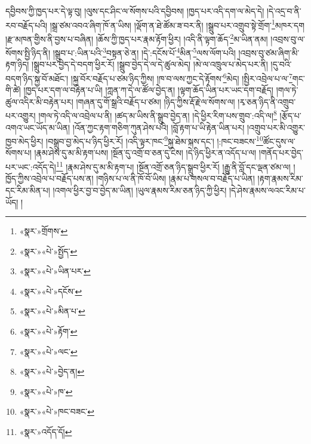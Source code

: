 དབྱིབས་ཀྱི་ཁྱད་པར་དེ་ལྟ་བུ། །ལུས་དང་ཤིང་ལ་སོགས་པའི་དབྱིབས། །ཁྱད་པར་འདི་དག་ལ་མེད་དེ། །དེ་འདྲ་བ་ནི་རབ་བརྗོད་པའི། །སྒྲ་ཙམ་འབའ་ཞིག་ཁོ་ན་ཡིས། །ལྡོག་ན་ཐེ་ཚོམ་ཟ་བར་ནི། །སྒྲུབ་པར་འགྲུབ་སྟེ་གྲོག་\footnote{«སྣར་»གྲོགས་}མཁར་དག །རྫ་མཁན་གྱིས་ནི་བྱས་པ་བཞིན། །ཆོས་ཀྱི་ཁྱད་པར་རྣམ་རྟོག་ཕྱིར། །འདི་ནི་ལྟག་ཆོད་\footnote{«སྣར་»«པེ་»སྤྱོད་}མ་ཡིན་ནམ། །འབྲས་བུ་ལ་སོགས་སྤྱི་ཉིད་ནི། །སྒྲུབ་པ་:ཡིན་པའི་\footnote{«སྣར་»«པེ་»ཡིན་པར་}བསྟན་ཅེ་ན། །དེ་:དངོས་པོ་\footnote{«སྣར་»«པེ་»དངོས་}མིན་\footnote{«སྣར་»«པེ་»མིན་པ་}ལས་ལོག་པའི། །འབྲས་བུ་ཙམ་ཞིག་མི་རྟག་ཉིད། །སྒྲུབ་པར་བྱེད་དེ་བདག་ཕྱིར་རོ། །སྒྲུབ་བྱེད་དེ་ལ་དེ་ཚུལ་མེད། །མེ་ལ་འཁྲུལ་པ་མེད་པར་ནི། །དུ་བའི་བདག་ཉིད་སྐྱ་བོ་མཐོང་། །སྐྱ་བོར་བརྗོད་པ་ཙམ་ཉིད་ཀྱིས། །ཁ་བ་ལས་ཀྱང་དེ་རྟོགས་\footnote{«སྣར་»«པེ་»རྟོག་}མེད། །སྤྱིར་འབྲེལ་པ་ལ་\footnote{«སྣར་»«པེ་»ལང་}གང་གི་ཚེ། །ཁྱད་པར་དག་ལ་བརྟེན་པ་ཡི། །ཀླན་ཀ་དེ་ལ་ཚོལ་བྱེད་ན། །ལྟག་ཆོད་ཡིན་པར་ཡང་དག་བརྗོད། །གལ་ཏེ་ཚུལ་འདིར་མི་བརྟེན་པར། །གཞན་དུ་གོ་སྒྲའི་བརྗོད་པ་ཙམ། །ཉིད་ཀྱིས་རྡོ་རྗེ་ལ་སོགས་ལ། །རྭ་ཅན་ཉིད་ནི་འགྲུབ་པར་འགྱུར། །གལ་ཏེ་འདི་ལ་འབྲེལ་པ་ནི། །ཚད་མ་ཡིས་ནི་སྒྲུབ་བྱེད་ན། །དེ་ཕྱིར་རིག་པས་གྲུབ་:འདི་ལ།\footnote{«སྣར་»«པེ་»བྱེད་ན།} །རྩོད་པ་འགའ་ཡང་ཡོད་མ་ཡིན། །འོན་ཀྱང་རྟག་གཅིག་ཀུན་ཤེས་པའི། །བློ་རྟག་པ་ཡི་རྟེན་ཡིན་པར། །འགྲུབ་པར་མི་འགྱུར་ཁྱབ་མེད་ཕྱིར། །བསྒྲུབ་བྱ་མེད་པ་ཉིད་ཕྱིར་རོ། །འདི་ལྟར་ཁང་\footnote{«སྣར་»«པེ་»ཁ་}སྐྱ་ཐེམ་སྐས་དང་། །:ཁང་བཟངས་\footnote{«སྣར་»«པེ་»ཁང་བཟང་}ཚོང་དུས་ལ་སོགས་པ། །རྣམ་ཤེས་དུ་མ་མི་རྟག་པས། །སྔོན་དུ་འགྲོ་བ་ཅན་དུ་ངེས། །དེ་ཉིད་ཕྱིར་ན་འདོད་པ་ལ། །གནོད་པར་བྱེད་པར་ཡང་:འདོད་དེ།\footnote{«སྣར་»འདོད་དོ།} །རྣམ་ཤེས་དུ་མ་མི་རྟག་པ། །སྔོན་འགྲོ་ཅན་ཉིད་སྒྲུབ་ཕྱིར་རོ། །རྒྱུ་ནི་བློ་དང་ལྡན་ཙམ་ལ། །ཁྱོད་ཀྱིས་འབྲེལ་པ་བརྗོད་པས་ན། །གཉིས་པ་ལ་ནི་ཁོ་བོ་ཡིས། །རྣམ་པ་གསལ་བ་བརྗོད་པ་ཡིན། །རྟག་རྣམས་རིམ་དང་རིམ་མིན་པ། །འགལ་ཕྱིར་བྱ་བ་བྱེད་མ་ཡིན། །ཡུལ་རྣམས་རིམ་ཅན་ཉིད་ཀྱི་ཕྱིར། །དེ་ཤེས་རྣམས་ལའང་རིམ་པ་ཡོད། །
